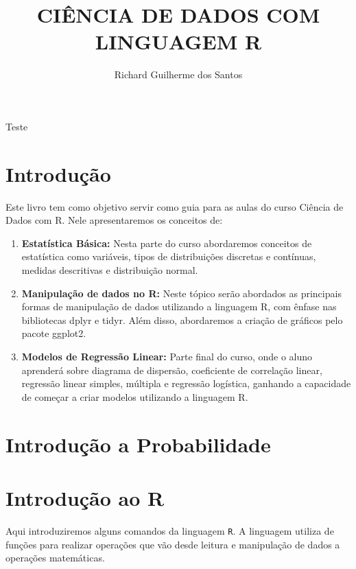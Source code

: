 \documentclass[
]{book}
\title{CIÊNCIA DE DADOS COM LINGUAGEM R}
\author{Richard Guilherme dos Santos}
\date{}
\providecommand{\tightlist}{%
  \setlength{\itemsep}{0pt}\setlength{\parskip}{0pt}}
\begin{document}
\maketitle

{
\setcounter{tocdepth}{1}
\tableofcontents
}
Teste

\hypertarget{introduuxe7uxe3o}{%
\chapter{Introdução}\label{introduuxe7uxe3o}}

Este livro tem como objetivo servir como guia para as aulas do curso Ciência de Dados com R. Nele apresentaremos os conceitos de:

\begin{enumerate}
\def\labelenumi{\arabic{enumi}.}
\tightlist
\item
  \textbf{Estatística Básica:} Nesta parte do curso abordaremos conceitos de estatística como variáveis, tipos de distribuições discretas e contínuas, medidas descritivas e distribuição normal.
\item
  \textbf{Manipulação de dados no R:} Neste tópico serão abordados as principais formas de manipulação de dados utilizando a linguagem R, com ênfase nas bibliotecas dplyr e tidyr. Além disso, abordaremos a criação de gráficos pelo pacote ggplot2.
\item
  \textbf{Modelos de Regressão Linear:} Parte final do curso, onde o aluno aprenderá sobre diagrama de dispersão, coeficiente de correlação linear, regressão linear simples, múltipla e regressão logística, ganhando a capacidade de começar a criar modelos utilizando a linguagem R.
\end{enumerate}

\hypertarget{introduuxe7uxe3o-a-probabilidade}{%
\chapter{Introdução a Probabilidade}\label{introduuxe7uxe3o-a-probabilidade}}

\hypertarget{introduuxe7uxe3o-ao-r}{%
\chapter{Introdução ao R}\label{introduuxe7uxe3o-ao-r}}

Aqui introduziremos alguns comandos da linguagem \texttt{R}. A linguagem utiliza de funções para realizar operações que vão desde leitura e manipulação de dados a operações matemáticas.
\end{document}
